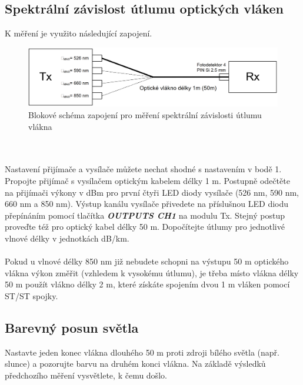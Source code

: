 \subsection{Spektrální závislost útlumu optických vláken}
K měření je využito následující zapojení.
\begin{figure}[h]
\centering
\includegraphics[width=12cm]{images/obr10.png}
\caption{Blokové schéma zapojení pro měření spektrální závislosti útlumu vlákna}
\label{fig:10}
\end{figure}
\\\\
Nastavení přijímače a vysílače můžete nechat shodné s nastavením v bodě 1. Propojte přijímač s vysílačem optickým kabelem délky 1 m. Postupně odečtěte na přijímači výkony v dBm pro první čtyři LED diody vysílače (526 nm, 590 nm, 660 nm a 850 nm). Výstup kanálu vysílače přivedete na příslušnou LED diodu přepínáním pomocí tlačítka \textbf{\textit{OUTPUTS CH1}} na modulu Tx. Stejný postup proveďte též pro optický kabel délky 50 m. Dopočítejte útlumy pro jednotlivé vlnové délky v jednotkách dB/km.
\\\\
Pokud u vlnové délky 850 nm již nebudete schopni na výstupu 50 m optického vlákna výkon změřit (vzhledem k vysokému útlumu), je třeba místo vlákna délky 50 m použít vlákno délky 2 m, které získáte spojením dvou 1 m vláken pomocí ST/ST spojky.

\subsection{Barevný posun světla}
Nastavte jeden konec vlákna dlouhého 50 m proti zdroji bílého světla (např. slunce) a pozorujte barvu na druhém konci vlákna. Na základě výsledků předchozího měření vysvětlete, k čemu došlo.

